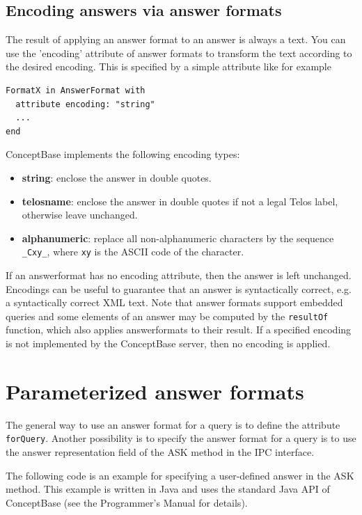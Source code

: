 \subsection{Encoding answers via answer formats}

The result of applying an answer format to an answer is always a text. You can use the 'encoding' attribute of answer formats
to transform the text according to the desired encoding. This is specified by a simple attribute like for example
{\small
\begin{verbatim}
FormatX in AnswerFormat with
  attribute encoding: "string"
  ...
end
\end{verbatim}
}

ConceptBase implements the following encoding types:

\begin{itemize}
\item {\bf string}: enclose the answer in double quotes.
\item {\bf telosname}: enclose the answer in double quotes if not a legal Telos label, otherwise leave unchanged.
\item {\bf alphanumeric}: replace all non-alphanumeric characters by the sequence {\tt \_Cxy\_}, where {\tt xy} is the
ASCII code of the character.
\end{itemize}

If an answerformat has no encoding attribute, then the answer is left unchanged. Encodings can be useful to guarantee
that an answer is syntactically correct, e.g. a syntactically correct XML text. Note that answer formats support
embedded queries and some elements of an answer may be computed by the {\tt resultOf} function, which also applies
answerformats to their result.
If a specified encoding is not implemented by the ConceptBase server, then no encoding is applied.




\section{Parameterized answer formats}

The general way to use an answer format for a query is to define the attribute {\tt forQuery}. Another possibility
is to specify the answer format for a query is to use the answer representation field of the ASK method in the IPC interface.

The following code is an example for specifying a user-defined answer in the ASK method.
This example is written in Java and uses the standard Java API of ConceptBase (see
the Programmer's Manual for details).

